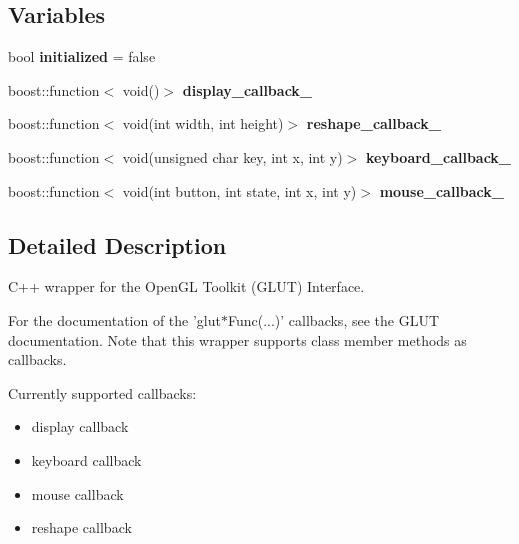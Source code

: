 \subsection*{Variables}
\begin{CompactItemize}
\item 
\hypertarget{namespace_pg_g_l_u_t_42c6ad84b072511d0c8ff6694c52c290}{
bool \textbf{initialized} = false}
\label{namespace_pg_g_l_u_t_42c6ad84b072511d0c8ff6694c52c290}

\item 
\hypertarget{namespace_pg_g_l_u_t_4e93bbd8b6ef708f1d6315ca2e392bac}{
boost::function$<$ void()$>$ \textbf{display\_\-callback\_\-}}
\label{namespace_pg_g_l_u_t_4e93bbd8b6ef708f1d6315ca2e392bac}

\item 
\hypertarget{namespace_pg_g_l_u_t_dd12ad891fdece002a1327dc6ac038f3}{
boost::function$<$ void(int width, int height)$>$ \textbf{reshape\_\-callback\_\-}}
\label{namespace_pg_g_l_u_t_dd12ad891fdece002a1327dc6ac038f3}

\item 
\hypertarget{namespace_pg_g_l_u_t_e836854ec62dc098cb133b80fb35def3}{
boost::function$<$ void(unsigned char key, int x, int y)$>$ \textbf{keyboard\_\-callback\_\-}}
\label{namespace_pg_g_l_u_t_e836854ec62dc098cb133b80fb35def3}

\item 
\hypertarget{namespace_pg_g_l_u_t_ae24b864c33424737d09a021100aa541}{
boost::function$<$ void(int button, int state, int x, int y)$>$ \textbf{mouse\_\-callback\_\-}}
\label{namespace_pg_g_l_u_t_ae24b864c33424737d09a021100aa541}

\end{CompactItemize}


\subsection{Detailed Description}
C++ wrapper for the OpenGL Toolkit (GLUT) Interface. 

For the documentation of the 'glut$\ast$Func(...)' callbacks, see the GLUT documentation. Note that this wrapper supports class member methods as callbacks.

Currently supported callbacks:\begin{itemize}
\item display callback\item keyboard callback\item mouse callback\item reshape callback\end{itemize}


